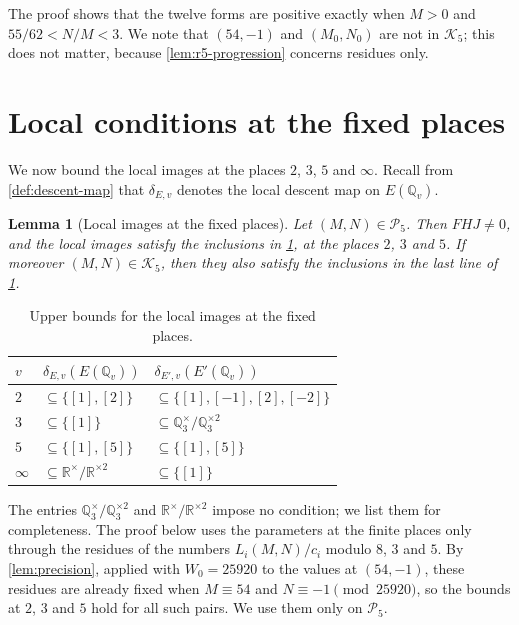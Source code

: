 \documentclass[12pt,oneside,openany]{book}
\theoremstyle{definition}
\theoremstyle{plain}
\numberwithin{equation}{chapter}
\theoremstyle{plain}
\newtheorem{lemma}[lemma]{Lemma}
\theoremstyle{definition}
\theoremstyle{remark}
\newcommand{\Q}{\mathbb Q}
\newcommand{\R}{\mathbb R}
\newcommand{\sq}[1]{[#1]}
\newcommand{\sqgp}[1]{#1^{\times}/#1^{\times2}}
\newcommand{\cP}{\mathcal P}
\newcommand{\cK}{\mathcal K}
\begin{document}
The proof shows that the twelve forms are positive exactly when $M>0$ and $55/62<N/M<3$. We note that $(54,-1)$ and $(M_0,N_0)$ are not in $\cK_5$; this does not matter, because \cref{lem:r5-progression} concerns residues only.

\section{Local conditions at the fixed places}\label{sec:r5-fixed}

We now bound the local images at the places $2$, $3$, $5$ and $\infty$. Recall from \cref{def:descent-map} that $\delta_{E,v}$ denotes the local descent map on $E(\Q_v)$.

\begin{lemma}[Local images at the fixed places]\label{lem:r5-fixed}
Let $(M,N)\in\cP_5$. Then $FHJ\ne0$, and the local images satisfy the inclusions in \cref{tab:r5-fixed}, at the places $2$, $3$ and $5$. If moreover $(M,N)\in\cK_5$, then they also satisfy the inclusions in the last line of \cref{tab:r5-fixed}.
\end{lemma}

\begin{table}[htbp]
\centering
\caption{Upper bounds for the local images at the fixed places.}\label{tab:r5-fixed}
\begin{tabular}{lll}
\toprule
$v$ & $\delta_{E,v}(E(\Q_v))$ & $\delta_{E',v}(E'(\Q_v))$\\
\midrule
$2$ & $\subseteq\{\sq1,\sq2\}$ & $\subseteq\{\sq1,\sq{-1},\sq2,\sq{-2}\}$\\
$3$ & $\subseteq\{\sq1\}$ & $\subseteq\sqgp{\Q_3}$\\
$5$ & $\subseteq\{\sq1,\sq5\}$ & $\subseteq\{\sq1,\sq5\}$\\
$\infty$ & $\subseteq\sqgp{\R}$ & $\subseteq\{\sq1\}$\\
\bottomrule
\end{tabular}
\end{table}

The entries $\sqgp{\Q_3}$ and $\sqgp{\R}$ impose no condition; we list them for completeness. The proof below uses the parameters at the finite places only through the residues of the numbers $L_i(M,N)/c_i$ modulo $8$, $3$ and $5$. By \cref{lem:precision}, applied with $W_0=25920$ to the values at $(54,-1)$, these residues are already fixed when $M\equiv54$ and $N\equiv-1\pmod{25920}$, so the bounds at $2$, $3$ and $5$ hold for all such pairs. We use them only on $\cP_5$.
\end{document}
